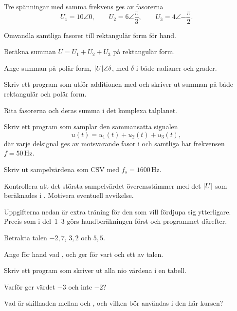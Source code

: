 Tre spänningar med samma frekvens ges av fasorerna
\[
  U_1 = 10\angle 0, \qquad U_2 = 6\angle\frac{\pi}{3}, \qquad U_3 = 4\angle{-\frac{\pi}{2}}.
\]
\begin{parts}
  \item Omvandla samtliga fasorer till rektangulär form för hand.
  \item Beräkna summan $U = U_1 + U_2 + U_3$ på rektangulär form.
  \item Ange summan på polär form, $\lvert U\rvert\angle\delta$, med $\delta$ i både radianer och
    grader.
  \item Skriv ett program som utför additionen med  och skriver ut summan på både
    rektangulär och polär form.
  \item Rita fasorerna och deras summa i det komplexa talplanet.
\end{parts}

\begin{parts}
  \item Skriv ett program som samplar den sammansatta signalen
    \[
      u(t) = u_1(t) + u_2(t) + u_3(t),
    \]
    där varje delsignal ges av motsvarande fasor i  och samtliga har frekvensen
    $f = 50\,\text{Hz}$.
  \item Skriv ut sampelvärdena som CSV med $f_s = 1600\,\text{Hz}$.
  \item Kontrollera att det största sampelvärdet överensstämmer med det $\lvert U\rvert$ som beräknades
    i . Motivera eventuell avvikelse.
\end{parts}

Uppgifterna nedan är extra träning för den som vill fördjupa sig ytterligare. Precis som i
del~1--3 görs handberäkningen först och programmet därefter.

Betrakta talen $-2{,}7$, $3{,}2$ och $5{,}5$.
\begin{parts}
  \item Ange för hand vad ,  och  ger för vart och ett
    av talen.
  \item Skriv ett program som skriver ut alla nio värdena i en tabell.
  \item Varför ger  värdet $-3$ och inte $-2$?
  \item Vad är skillnaden mellan  och , och vilken bör användas i den
    här kursen?
\end{parts}

